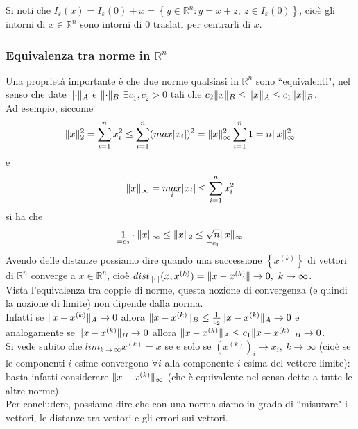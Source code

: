 Si noti che $I_\varepsilon(x) = I_\varepsilon(0) + x = \left\{ y \in \mathbb{R}^n : y = x+z, \ z \in I_\varepsilon(0) \right\}$,
cioè gli intorni di $x \in \mathbb{R}^n$ sono intorni di 0 traslati per centrarli di $x$.

\subsubsection{Equivalenza tra norme in $\mathbb{R}^n$}
Una proprietà importante è che due norme qualsiasi in $\mathbb{R}^n$ sono ``equivalenti", nel senso che date $\lVert\cdot\rVert_A$ e $\lVert\cdot\rVert_B$ $\exists c_1, c_2 > 0$ tali che  $c_2\lVert x\rVert_B \leq \lVert x\rVert_A \leq c_1\lVert x\rVert_B$. \\
Ad esempio, siccome 
\begin{equation*}
        \lVert x\rVert_2^2 = \sum_{i=1}^n x_i^2 \leq \sum_{i=1}^n (max\lvert x_i \rvert)^2 = \lVert x\rVert_\infty^2 \sum_{i=1}^n 1 = n \lVert x\rVert_\infty^2
\end{equation*}
e
\begin{equation*}
    \lVert x\rVert_\infty = \underset{i}{max}\lvert x_i \rvert \leq \sum_{i=1}^n x_i^2
\end{equation*}
si ha che 
\begin{equation*}
    \underset{=c_2}{1} \cdot \lVert x\rVert_\infty \leq \lVert x\rVert_2 \leq \underset{=c_1}{\sqrt{n}} \lVert x\rVert_\infty
\end{equation*}
Avendo delle distanze possiamo dire quando una successione $\left\{ x^{(k)} \right\}$ di vettori di $\mathbb{R}^n$ converge a $x \in \mathbb{R}^n$, cioè $dist_{\lVert\cdot\rVert}(x,x^{(k)}) = \lVert x-x^{(k)}\rVert \rightarrow 0, \ k \rightarrow \infty$.\\
Vista l'equivalenza tra coppie di norme, questa nozione di convergenza (e quindi la nozione di limite) \uline{non} dipende dalla norma.\\
Infatti se $\lVert x-x^{(k)}\rVert_A \rightarrow 0$ allora $\lVert x-x^{(k)}\rVert_B \leq \frac{1}{c_2}\lVert x-x^{(k)}\rVert_A \rightarrow 0$ e analogamente se $\lVert x-x^{(k)}\rVert_B \rightarrow 0$ allora $\lVert x-x^{(k)}\rVert_A \leq c_1 \lVert x-x^{(k)}\rVert_B \rightarrow 0$. \\
Si vede subito che $lim_{k\to \infty} x^{(k)} = x$
se e solo se $(x^{(k)})_i \rightarrow x_i, \ k \to \infty$ (cioè se le componenti $i$-esime convergono $\forall i$ alla componente $i$-esima del vettore limite): basta infatti considerare $\lVert x-x^{(k)}\rVert_\infty$ (che è equivalente nel senso detto a tutte le altre norme).\\
Per concludere, possiamo dire che con una norma siamo in grado di ``misurare" i vettori, le distanze tra vettori e gli errori sui vettori.


